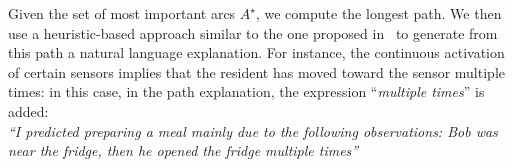 Given the set of most important arcs $A^\star$, we compute the longest path.
We then use a heuristic-based approach similar to the one proposed in~\cite{arrotta2022dexar} to generate from this path a natural language explanation.
For instance, the continuous activation of certain sensors implies that the resident has moved toward the sensor multiple times: in this case, in the path explanation, the expression ``\textit{multiple times}'' is added:\\

  \textit{``I predicted preparing a meal mainly due to the following observations: Bob was near the fridge, then he opened the fridge multiple times''}\\


